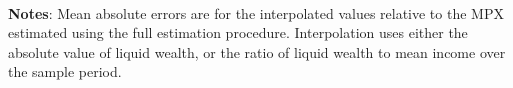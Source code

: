 \begin{minipage}{0.65\textwidth}
\end{minipage}
\\ \textbf{Notes}: Mean absolute errors are for the interpolated values relative to the MPX estimated using the full estimation procedure. Interpolation uses either the absolute value of liquid wealth, or the ratio of liquid wealth to mean income over the sample period. 
